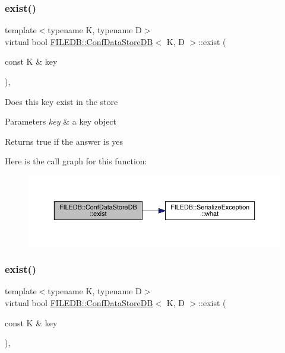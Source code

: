 \subsubsection{\texorpdfstring{exist()}{exist()}\hspace{0.1cm}{\footnotesize\ttfamily [1/2]}}
{\footnotesize\ttfamily template$<$typename K, typename D$>$ \\
virtual bool \mbox{\hyperlink{classFILEDB_1_1ConfDataStoreDB}{F\+I\+L\+E\+D\+B\+::\+Conf\+Data\+Store\+DB}}$<$ K, D $>$\+::exist (\begin{DoxyParamCaption}\item[{const K \&}]{key }\end{DoxyParamCaption})\hspace{0.3cm}{\ttfamily [inline]}, {\ttfamily [virtual]}}

Does this key exist in the store 
\begin{DoxyParams}{Parameters}
{\em key} & a key object \\
\hline
\end{DoxyParams}
\begin{DoxyReturn}{Returns}
true if the answer is yes 
\end{DoxyReturn}
Here is the call graph for this function\+:
\nopagebreak
\begin{figure}[H]
\begin{center}
\leavevmode
\includegraphics[width=350pt]{d8/d19/classFILEDB_1_1ConfDataStoreDB_afedf2b2ec0b10469cebb72397b02459d_cgraph}
\end{center}
\end{figure}
\mbox{\label{classFILEDB_1_1ConfDataStoreDB_afedf2b2ec0b10469cebb72397b02459d}} 
\subsubsection{\texorpdfstring{exist()}{exist()}\hspace{0.1cm}{\footnotesize\ttfamily [2/2]}}
{\footnotesize\ttfamily template$<$typename K, typename D$>$ \\
virtual bool \mbox{\hyperlink{classFILEDB_1_1ConfDataStoreDB}{F\+I\+L\+E\+D\+B\+::\+Conf\+Data\+Store\+DB}}$<$ K, D $>$\+::exist (\begin{DoxyParamCaption}\item[{const K \&}]{key }\end{DoxyParamCaption})\hspace{0.3cm}{\ttfamily [inline]}, {\ttfamily [virtual]}}

